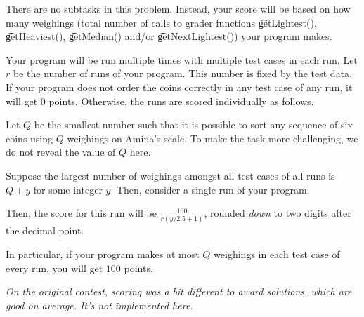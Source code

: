 There are no subtasks in this problem. Instead, your score will be based on how many weighings (total number of calls to grader functions \t{getLightest()}, \t{getHeaviest()}, \t{getMedian()} and/or \t{getNextLightest()}) your program makes.

Your program will be run multiple times with multiple test cases in each run. Let $r$ be the number of runs of your program. This number is fixed by the test data. If your program does not order the coins correctly in any test case of any run, it will get $0$ points. Otherwise, the runs are scored individually as follows.

Let $Q$ be the smallest number such that it is possible to sort any sequence of six coins using $Q$ weighings on Amina's scale. To make the task more challenging, we do not reveal the value of $Q$ here.

Suppose the largest number of weighings amongst all test cases of all runs is $Q + y$ for some integer $y$. Then, consider a single run of your program. 


Then, the score for this run will be $\frac{100}{r(y / 2.5 + 1)}$, rounded \textit{down} to two digits after the decimal point.

In particular, if your program makes at most $Q$ weighings in each test case of every run, you will get $100$ points.

{\it On the original contest, scoring was a bit different to award solutions, which are good on average. It's not implemented here. } 
